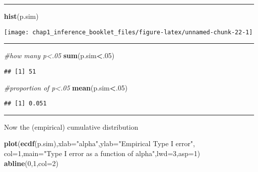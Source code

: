\documentclass[]{article}
\newenvironment{Shaded}{\begin{snugshade}}{\end{snugshade}}
\newcommand{\KeywordTok}[1]{\textcolor[rgb]{0.13,0.29,0.53}{\textbf{#1}}}
\newcommand{\DataTypeTok}[1]{\textcolor[rgb]{0.13,0.29,0.53}{#1}}
\newcommand{\DecValTok}[1]{\textcolor[rgb]{0.00,0.00,0.81}{#1}}
\newcommand{\StringTok}[1]{\textcolor[rgb]{0.31,0.60,0.02}{#1}}
\newcommand{\CommentTok}[1]{\textcolor[rgb]{0.56,0.35,0.01}{\textit{#1}}}
\newcommand{\OperatorTok}[1]{\textcolor[rgb]{0.81,0.36,0.00}{\textbf{#1}}}
\newcommand{\NormalTok}[1]{#1}
\begin{document}
\begin{center}\rule{0.5\linewidth}{\linethickness}\end{center}

\begin{Shaded}
\begin{Highlighting}[]
\KeywordTok{hist}\NormalTok{(p.sim)}
\end{Highlighting}
\end{Shaded}

\begin{center}\texttt{[image: chap1\_inference\_booklet\_files/figure-latex/unnamed-chunk-22-1]} \end{center}

\begin{center}\rule{0.5\linewidth}{\linethickness}\end{center}

\begin{Shaded}
\begin{Highlighting}[]
\CommentTok{#how many p<.05}
\KeywordTok{sum}\NormalTok{(p.sim}\OperatorTok{<}\NormalTok{.}\DecValTok{05}\NormalTok{)}
\end{Highlighting}
\end{Shaded}

\begin{verbatim}
## [1] 51
\end{verbatim}

\begin{Shaded}
\begin{Highlighting}[]
\CommentTok{#proportion of p<.05}
\KeywordTok{mean}\NormalTok{(p.sim}\OperatorTok{<}\NormalTok{.}\DecValTok{05}\NormalTok{)}
\end{Highlighting}
\end{Shaded}

\begin{verbatim}
## [1] 0.051
\end{verbatim}

\begin{center}\rule{0.5\linewidth}{\linethickness}\end{center}

Now the (empirical) cumulative distribution

\begin{Shaded}
\begin{Highlighting}[]
\KeywordTok{plot}\NormalTok{(}\KeywordTok{ecdf}\NormalTok{(p.sim),}\DataTypeTok{xlab=}\StringTok{"alpha"}\NormalTok{,}\DataTypeTok{ylab=}\StringTok{"Empirical Type I error"}\NormalTok{, }\DataTypeTok{col=}\DecValTok{1}\NormalTok{,}\DataTypeTok{main=}\StringTok{"Type I error as a function of alpha"}\NormalTok{,}\DataTypeTok{lwd=}\DecValTok{3}\NormalTok{,}\DataTypeTok{asp=}\DecValTok{1}\NormalTok{)}
\KeywordTok{abline}\NormalTok{(}\DecValTok{0}\NormalTok{,}\DecValTok{1}\NormalTok{,}\DataTypeTok{col=}\DecValTok{2}\NormalTok{)}
\end{Highlighting}
\end{Shaded}
\end{document}
